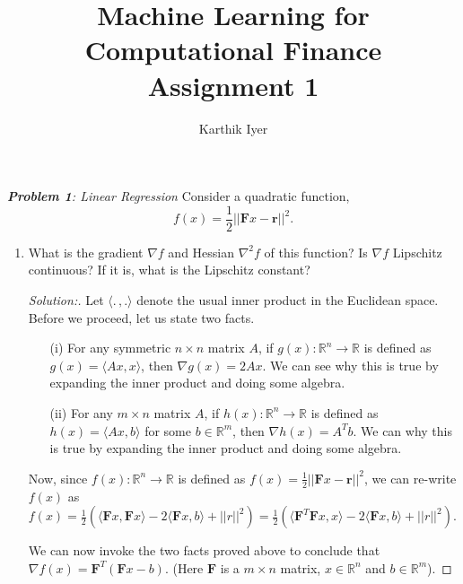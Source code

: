 \documentclass[a4paper,11pt,reqno]{amsart}
\title{Machine Learning for Computational Finance \\Assignment 1}
\author{ Karthik Iyer}
\theoremstyle{plain}
\theoremstyle{definition}
\theoremstyle{remark}
\numberwithin{equation}{section}
\begin{document}
\maketitle
{\it \textbf{Problem 1}: Linear Regression}
\vskip 8pt
Consider a quadratic function,
\[
f(x) = \frac{1}{2}||\mathbf{F}x - \mathbf{r}||^2.
\]
\begin{enumerate}
\item What is the gradient $\nabla f$ and Hessian $\nabla^2 f$ of this function? Is $\nabla f$ Lipschitz continuous? If it is, what is the Lipschitz constant?
\begin{proof}[Solution:] 
	
Let $\langle.\,,. \rangle$ denote the usual inner product in the Euclidean space. 	Before we proceed, let us state two facts.
	\begin{enumerate}
		\item[(i)]  For any symmetric $n \times n$ matrix $A$, if $g(x): \mathbb{R}^n \to \mathbb{R}$ is defined as $g(x) = \langle Ax, x \rangle$, then $\nabla g(x) = 2 Ax$. We can see why this is true by expanding the inner product and doing some algebra. 
		\item[(ii)] For any $m \times n$ matrix $A$, if $h(x): \mathbb{R}^n \to \mathbb{R}$ is defined as $h(x) = \langle Ax, b \rangle$ for some $b \in \mathbb{R}^m$, then $\nabla h(x) = A^T b$. We can why this is true by expanding the inner product and doing some algebra. 
	\end{enumerate}
	 
	 Now, since $f(x): \mathbb{R}^n \to \mathbb{R}$ is defined as $f(x) = \frac{1}{2} ||\mathbf{F}x - \mathbf{r}||^2$, we can re-write $f(x)$ as $f(x) = \frac{1}{2}( \langle \mathbf{F}x, \mathbf{F}x\rangle - 2 \langle \mathbf{F}x, b \rangle + ||r||^2 ) = \frac{1}{2}( \langle \mathbf{F}^T \mathbf{F}x, x \rangle - 2 \langle \mathbf{F}x, b \rangle + ||r||^2 ). $
	 
	 We can now invoke the two facts proved above to conclude that 
	 $\nabla f(x) = \mathbf{F}^T(\mathbf{F} x - b)$. (Here $\mathbf{F}$ is a $m \times n $ matrix, $x \in \mathbb{R}^n$ and $b \in \mathbb{R}^m$).
	 

\end{proof}
\end{enumerate}
\end{document}
